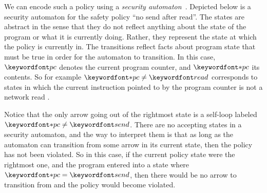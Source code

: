 \documentclass[11pt,twoside]{scrartcl}
\begin{document}
We can encode such a policy using a \emph{security automaton}~\cite{Schneider2000}. Depicted below is a security automaton for the safety policy ``no send after read''. The states are abstract in the sense that they do not reflect anything about the state of the program or what it is currently doing. Rather, they represent the state at which the policy is currently in. The transitions reflect facts about program state that must be true in order for the automaton to transition. In this case, $\pc$ denotes the current program counter, and $\pcderef$ its contents. So for example $\pcderef \ne \pread$ corresponds to states in which the current instruction pointed to by the program counter is not a network read \pread.
\begin{center}
\end{center}
Notice that the only arrow going out of the rightmost state is a self-loop labeled $\pcderef \ne \psend$. There are no accepting states in a security automaton, and the way to interpret them is that as long as the automaton can transition from some arrow in its current state, then the policy has not been violated. So in this case, if the current policy state were the rightmost one, and the program entered into a state where $\pcderef = \psend$, then there would be no arrow to transition from and the policy would become violated.
\end{document}
